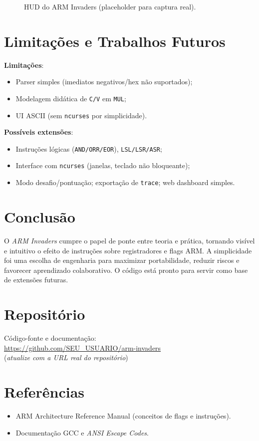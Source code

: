 \documentclass[12pt,a4paper]{article}
\begin{document}
\begin{figure}[H]
  \centering
  \fbox{\rule{0pt}{3cm}\rule{0.9\linewidth}{0pt}} %
  \caption{HUD do ARM Invaders (placeholder para captura real).}
\end{figure}

\section{Limitações e Trabalhos Futuros}
\textbf{Limitações}:
\begin{itemize}[noitemsep]
  \item Parser simples (imediatos negativos/hex não suportados);
  \item Modelagem didática de \texttt{C/V} em \texttt{MUL};
  \item UI ASCII (sem \texttt{ncurses} por simplicidade).
\end{itemize}
\textbf{Possíveis extensões}:
\begin{itemize}[noitemsep]
  \item Instruções lógicas (\texttt{AND/ORR/EOR}), \texttt{LSL/LSR/ASR};
  \item Interface com \texttt{ncurses} (janelas, teclado não bloqueante);
  \item Modo desafio/pontuação; exportação de \texttt{trace}; web dashboard simples.
\end{itemize}

\section{Conclusão}
O \textit{ARM Invaders} cumpre o papel de ponte entre teoria e prática, tornando visível e intuitivo o efeito de instruções sobre registradores e flags ARM. A simplicidade foi uma escolha de engenharia para maximizar portabilidade, reduzir riscos e favorecer aprendizado colaborativo. O código está pronto para servir como base de extensões futuras.

\section*{Repositório}
Código-fonte e documentação: \\
\url{https://github.com/SEU_USUARIO/arm-invaders} \\
(\textit{atualize com a URL real do repositório})

\section*{Referências}
\begin{itemize}[noitemsep]
  \item ARM Architecture Reference Manual (conceitos de flags e instruções).
  \item Documentação GCC e \textit{ANSI Escape Codes}.
\end{itemize}
\end{document}
